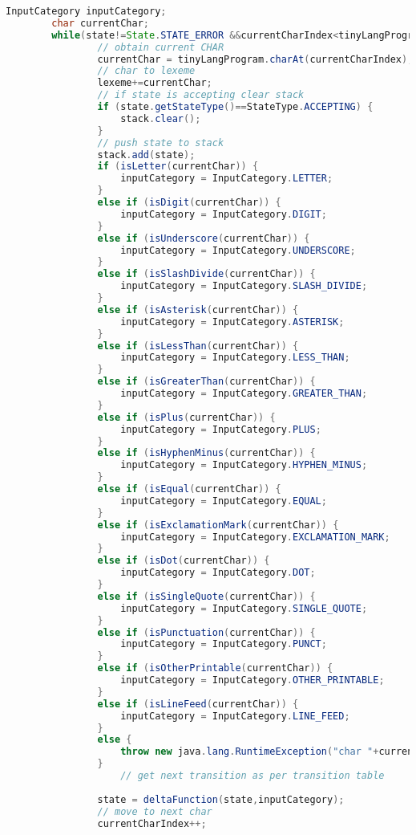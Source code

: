 \begin{lstlisting}[basicstyle=\miniscule,language=Java,caption=Table Driven Lexer,label=listing:tabledrivenlexer]
        InputCategory inputCategory;
        char currentChar;
        while(state!=State.STATE_ERROR &&currentCharIndex<tinyLangProgram.length()) {
        		// obtain current CHAR
				currentChar = tinyLangProgram.charAt(currentCharIndex);
				// char to lexeme
				lexeme+=currentChar;			
				// if state is accepting clear stack
				if (state.getStateType()==StateType.ACCEPTING) {
					stack.clear();
				}
				// push state to stack
				stack.add(state);
			 	if (isLetter(currentChar)) {
			 		inputCategory = InputCategory.LETTER;
	        	}
	        	else if (isDigit(currentChar)) {
			 		inputCategory = InputCategory.DIGIT;
	        	}
	        	else if (isUnderscore(currentChar)) {
			 		inputCategory = InputCategory.UNDERSCORE;
	        	}
	        	else if (isSlashDivide(currentChar)) {
			 		inputCategory = InputCategory.SLASH_DIVIDE;
	        	}
	        	else if (isAsterisk(currentChar)) {
			 		inputCategory = InputCategory.ASTERISK;
	        	}
	        	else if (isLessThan(currentChar)) {
			 		inputCategory = InputCategory.LESS_THAN;
	        	}
	        	else if (isGreaterThan(currentChar)) {
			 		inputCategory = InputCategory.GREATER_THAN;
	        	}
	        	else if (isPlus(currentChar)) {
			 		inputCategory = InputCategory.PLUS;
	        	}
	        	else if (isHyphenMinus(currentChar)) {
			 		inputCategory = InputCategory.HYPHEN_MINUS;
	        	}
	        	else if (isEqual(currentChar)) {
			 		inputCategory = InputCategory.EQUAL;
	        	}
	        	else if (isExclamationMark(currentChar)) {
			 		inputCategory = InputCategory.EXCLAMATION_MARK;
	        	}
	        	else if (isDot(currentChar)) {
			 		inputCategory = InputCategory.DOT;
	        	}
	        	else if (isSingleQuote(currentChar)) {
			 		inputCategory = InputCategory.SINGLE_QUOTE;
	        	}
	        	else if (isPunctuation(currentChar)) {
			 		inputCategory = InputCategory.PUNCT;
	        	}
	        	else if (isOtherPrintable(currentChar)) {
			 		inputCategory = InputCategory.OTHER_PRINTABLE;
	        	}
	        	else if (isLineFeed(currentChar)) {
			 		inputCategory = InputCategory.LINE_FEED;
	        	}
	        	else {
	        		throw new java.lang.RuntimeException("char "+currentChar+" in line " +lineNumber+" not recognised by TinyLang's grammar");
	        	}
	        		// get next transition as per transition table
			 	
			 	state = deltaFunction(state,inputCategory);
			 	// move to next char
	        	currentCharIndex++;
	        	
	        	


\end{lstlisting}
